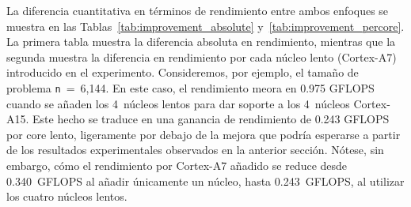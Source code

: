 %
%

La diferencia cuantitativa en términos de rendimiento entre ambos enfoques se muestra
en las Tablas~\ref{tab:improvement_absolute} y~\ref{tab:improvement_percore}. 
La primera tabla muestra la diferencia absoluta en rendimiento, mientras que la segunda 
muestra la diferencia en rendimiento por cada núcleo lento (Cortex-A7) introducido en
el experimento. Consideremos, por ejemplo, el tamaño de problema {\tt n}~=~6,144. 
En este caso, el rendimiento meora en 0.975 GFLOPS cuando se añaden los 4~núcleos lentos para 
dar soporte a los 4~núcleos Cortex-A15. Este hecho se traduce en una ganancia de rendimiento de
0.243 GFLOPS por core lento, ligeramente por debajo de la mejora que podría esperarse a partir de
los resultados experimentales observados en la anterior sección. Nótese, sin embargo, cómo el 
rendimiento por Cortex-A7 añadido se reduce desde 0.340~GFLOPS al añadir únicamente un núcleo,
hasta 0.243~GFLOPS, al utilizar los cuatro núcleos lentos.

\newcommand{\fg}[1]{\textcolor{ForestGreen}{#1}} %
\newcommand{\br}[1]{\textcolor{BrickRed}{#1}} %

